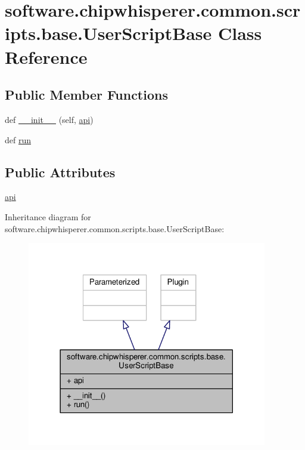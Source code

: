 \hypertarget{classsoftware_1_1chipwhisperer_1_1common_1_1scripts_1_1base_1_1UserScriptBase}{}\section{software.\+chipwhisperer.\+common.\+scripts.\+base.\+User\+Script\+Base Class Reference}
\label{classsoftware_1_1chipwhisperer_1_1common_1_1scripts_1_1base_1_1UserScriptBase}
\subsection*{Public Member Functions}
\begin{DoxyCompactItemize}
\item 
def \hyperlink{classsoftware_1_1chipwhisperer_1_1common_1_1scripts_1_1base_1_1UserScriptBase_a13aa17d03cc3f4f25fe0f1455e3314e4}{\+\_\+\+\_\+init\+\_\+\+\_\+} (self, \hyperlink{classsoftware_1_1chipwhisperer_1_1common_1_1scripts_1_1base_1_1UserScriptBase_a49ac32dfc7c50f6b50344f34630215a4}{api})
\item 
def \hyperlink{classsoftware_1_1chipwhisperer_1_1common_1_1scripts_1_1base_1_1UserScriptBase_accf59e6b421c87a0e612b18f2da5afd7}{run}
\end{DoxyCompactItemize}
\subsection*{Public Attributes}
\begin{DoxyCompactItemize}
\item 
\hyperlink{classsoftware_1_1chipwhisperer_1_1common_1_1scripts_1_1base_1_1UserScriptBase_a49ac32dfc7c50f6b50344f34630215a4}{api}
\end{DoxyCompactItemize}


Inheritance diagram for software.\+chipwhisperer.\+common.\+scripts.\+base.\+User\+Script\+Base\+:\nopagebreak
\begin{figure}[H]
\begin{center}
\leavevmode
\includegraphics[width=297pt]{d0/d38/classsoftware_1_1chipwhisperer_1_1common_1_1scripts_1_1base_1_1UserScriptBase__inherit__graph}
\end{center}
\end{figure}


